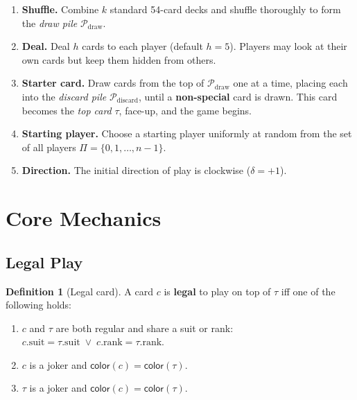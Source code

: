 \documentclass[11pt,a4paper,twoside]{article}
\theoremstyle{definition}
\newtheorem{definition}{Definition}[section]
\theoremstyle{remark}
\newcommand{\Pile}{\ensuremath{\mathcal{P}}}
\newcommand{\Top}{\ensuremath{\tau}}
\newcommand{\Dir}{\ensuremath{\delta}}
\newcommand{\Players}{\ensuremath{\Pi}}
\newcommand{\func}[1]{\ensuremath{\mathsf{#1}}}
\begin{document}
\begin{enumerate}[label=\textbf{S\arabic*.}, leftmargin=*]

  \item \textbf{Shuffle.} Combine $k$ standard 54-card decks and shuffle
  thoroughly to form the \emph{draw pile} $\Pile_{\text{draw}}$.

  \item \textbf{Deal.} Deal $h$ cards to each player (default $h = 5$).
  Players may look at their own cards but keep them hidden from others.

  \item \textbf{Starter card.} Draw cards from the top of $\Pile_{\text{draw}}$
  one at a time, placing each into the \emph{discard pile}
  $\Pile_{\text{discard}}$, until a \textbf{non-special} card is drawn.
  This card becomes the \emph{top card} $\Top$, face-up, and the game begins.

  \item \textbf{Starting player.} Choose a starting player uniformly at random
  from the set of all players $\Players = \{0, 1, \dots, n-1\}$.

  \item \textbf{Direction.} The initial direction of play is clockwise
  ($\Dir = +1$).

\end{enumerate}

\section{Core Mechanics}
\label{sec:core}

\subsection{Legal Play}

\begin{definition}[Legal card]
  A card $c$ is \textbf{legal} to play on top of $\Top$ iff one of the
  following holds:
  \begin{enumerate}[nosep, label=(\roman*)]
    \item $c$ and $\Top$ are both regular and share a suit or rank:
          $c.\text{suit} = \Top.\text{suit} \;\lor\; c.\text{rank} = \Top.\text{rank}$.
    \item $c$ is a joker and $\func{color}(c) = \func{color}(\Top)$.
    \item $\Top$ is a joker and $\func{color}(c) = \func{color}(\Top)$.
  \end{enumerate}
\end{definition}
\end{document}
